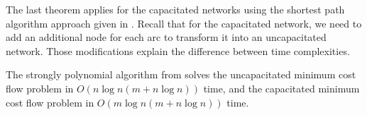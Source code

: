 The last theorem applies for the capacitated networks using the shortest path algorithm approach given in . Recall that for the capacitated network, we need to add an additional node for each arc to transform it into an uncapacitated network. Those modifications explain the difference between time complexities.

\begin{theorem}
    The strongly polynomial algorithm from \cite{orlin1993faster} solves the uncapacitated minimum cost flow problem in $O(n\log n (m + n \log n))$ time, and the capacitated minimum cost flow problem in $O(m \log n (m+ n\log n))$ time.
\end{theorem}